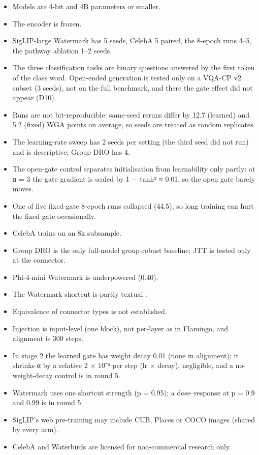 \begin{itemize}
\item
  Models are 4-bit and 4B parameters or smaller.
\item
  The encoder is frozen.
\item
  SigLIP-large Watermark has 5 seeds, CelebA 5 paired, the 8-epoch runs 4--5, the pathway ablation 1--2 seeds.
\item
  The three classification tasks are binary questions answered by the first token of the class word. Open-ended
  generation is tested only on a VQA-CP v2 subset (3 seeds), not on the full benchmark, and there the gate
  effect did not appear (D10).
\item
  Runs are not bit-reproducible: same-seed reruns differ by 12.7 (learned) and 5.2 (fixed) WGA points on
  average, so seeds are treated as random replicates.
\item
  The learning-rate sweep has 2 seeds per setting (the third seed did not run) and is descriptive; Group DRO has 4.
\item
  The open-gate control separates initialisation from learnability only partly: at α = 3 the gate gradient
  is scaled by 1 − tanh² ≈ 0.01, so the open gate barely moves.
\item
  One of five fixed-gate 8-epoch runs collapsed (44.5), so long training can hurt the fixed gate occasionally.
\item
  CelebA trains on an 8k subsample.
\item
  Group DRO is the only full-model group-robust baseline; JTT is tested only at the connector.
\item
  Phi-4-mini Watermark is underpowered (0.40).
\item
  The Watermark shortcut is partly textual \cite{materzynska2022disentangling}.
\item
  Equivalence of connector types is not established.
\item
  Injection is input-level (one block), not per-layer as in Flamingo, and alignment is 300 steps.
\item
  In stage 2 the learned gate has weight decay 0.01 (none in alignment); it shrinks α by a relative
  2 × 10⁻⁶ per step (lr × decay), negligible, and a no-weight-decay control is in round 5.
\item
  Watermark uses one shortcut strength (p = 0.95); a dose--response at p = 0.9 and 0.99 is in round 5.
\item
  SigLIP's web pre-training may include CUB, Places or COCO images (shared by every arm).
\item
  CelebA and Waterbirds are licensed for non-commercial research only.
\end{itemize}

